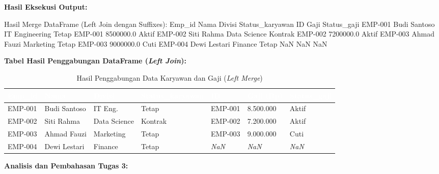 \documentclass[12pt,a4paper]{article}
\newcommand{\thead}[1]{\textcolor{white}{\textbf{#1}}}
\begin{document}
\begin{adjustwidth}{2.25cm}{0pt}
\textbf{Hasil Eksekusi Output:}
\begin{outputbox}
Hasil Merge DataFrame (Left Join dengan Suffixes):
 Emp_id         Nama         Divisi Status_karyawan      ID       Gaji Status_gaji
EMP-001 Budi Santoso IT Engineering           Tetap EMP-001  8500000.0       Aktif
EMP-002   Siti Rahma   Data Science         Kontrak EMP-002  7200000.0       Aktif
EMP-003  Ahmad Fauzi      Marketing           Tetap EMP-003  9000000.0        Cuti
EMP-004 Dewi Lestari        Finance           Tetap     NaN        NaN         NaN
\end{outputbox}

\textbf{Tabel Hasil Penggabungan DataFrame (\textit{Left Join}):}
\begin{table}[H]
\centering
\small
\caption{Hasil Penggabungan Data Karyawan dan Gaji (\textit{Left Merge})}
\label{tab:hasil-tugas3}
\begin{tabularx}{\linewidth}{@{}p{1.5cm}p{2.2cm}p{1.9cm}p{2.8cm}p{1.2cm}p{1.6cm}p{1.8cm}@{}}
\toprule
\rowcolor{ugmblue}\thead{Emp\_id} & \thead{Nama} & \thead{Divisi} & \thead{Status\_karyawan} & \thead{ID} & \thead{Gaji (Rp)} & \thead{Status\_gaji} \\
\midrule
\rowcolor{ppdrow}
EMP-001 & Budi Santoso & IT Eng. & Tetap & EMP-001 & 8.500.000 & Aktif \\
EMP-002 & Siti Rahma   & Data Science & Kontrak & EMP-002 & 7.200.000 & Aktif \\
\rowcolor{ppdrow}
EMP-003 & Ahmad Fauzi  & Marketing & Tetap & EMP-003 & 9.000.000 & Cuti \\
EMP-004 & Dewi Lestari & Finance & Tetap & \textit{NaN} & \textit{NaN} & \textit{NaN} \\
\bottomrule
\end{tabularx}
\end{table}

\textbf{Analisis dan Pembahasan Tugas 3:}
\end{adjustwidth}
\end{document}
